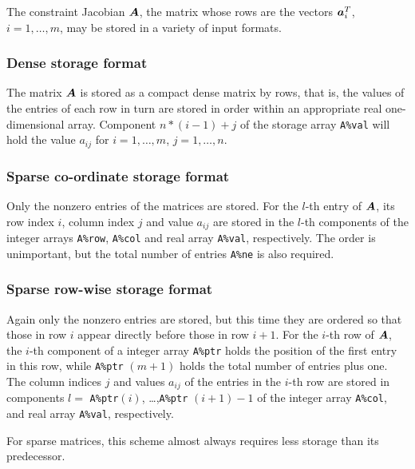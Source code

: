 \documentclass{galahad}
\begin{document}
\galmatrix
The constraint Jacobian ${\bm{A}}$, the matrix
whose rows are the vectors ${\bm{a}}_{i}^{T}$, $i = 1, \ldots , m$,
may be stored in a variety of input formats.

\subsubsection{Dense storage format}\label{dense}
The matrix ${\bm{A}}$ is stored as a compact
dense matrix by rows, that is, the values of the entries of each row in turn are
stored in order within an appropriate real one-dimensional array.
Component $n \ast (i-1) + j$ of the storage array {\tt A\%val} will hold the
value $a_{ij}$ for $i = 1, \ldots , m$, $j = 1, \ldots , n$.

\subsubsection{Sparse co-ordinate storage format}\label{coordinate}
Only the nonzero entries of the matrices are stored. For the
$l$-th entry of ${\bm{A}}$, its row index $i$, column index $j$
and value $a_{ij}$
are stored in the $l$-th components of the integer arrays {\tt A\%row},
{\tt A\%col} and real array {\tt A\%val}, respectively.
The order is unimportant, but the total
number of entries {\tt A\%ne} is also required.

\subsubsection{Sparse row-wise storage format}\label{rowwise}
Again only the nonzero entries are stored, but this time
they are ordered so that those in row $i$ appear directly before those
in row $i+1$. For the $i$-th row of ${\bm{A}}$, the $i$-th component of a
integer array {\tt A\%ptr} holds the position of the first entry in this row,
while {\tt A\%ptr} $(m+1)$ holds the total number of entries plus one.
The column indices $j$ and values $a_{ij}$ of the entries in the $i$-th row
are stored in components
$l =$ {\tt A\%ptr}$(i)$, \ldots ,{\tt A\%ptr} $(i+1)-1$ of the
integer array {\tt A\%col}, and real array {\tt A\%val}, respectively.

For sparse matrices, this scheme almost always requires less storage than
its predecessor.




\end{document}
